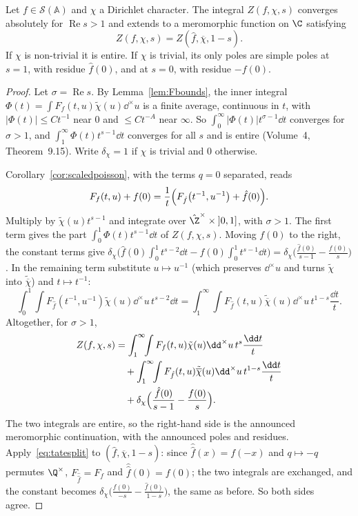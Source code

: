 \begin{theorem}\label{thm:tate}
Let $f\in\mathcal S(\mathbb{A})$ and $\chi$ a Dirichlet character. The integral $Z(f,\chi,s)$ converges absolutely for $\operatorname{Re}s>1$ and extends
to a meromorphic function on $\C$ satisfying
\[
Z(f,\chi,s)=Z(\hat f,\overline\chi,1-s).
\]
If $\chi$ is non-trivial it is entire. If $\chi$ is trivial, its only poles are simple poles at $s=1$, with residue $\hat f(0)$, and at
$s=0$, with residue $-f(0)$.
\end{theorem}
\begin{proof}
Let $\sigma=\operatorname{Re}s$. By Lemma~\ref{lem:Fbounds}, the inner integral $\Phi(t)=\int F_f(t,u)\tilde\chi(u)\dd^\times u$ is a finite average,
continuous in $t$, with $|\Phi(t)|\le Ct^{-1}$ near $0$ and $\le Ct^{-A}$ near $\infty$. So $\int_0^\infty|\Phi(t)|t^{\sigma-1}\dd t$ converges for
$\sigma>1$, and $\int_1^\infty\Phi(t)t^{s-1}\dd t$ converges for all $s$ and is entire (Volume~4, Theorem~9.15). Write $\delta_\chi=1$ if $\chi$ is
trivial and $0$ otherwise.

Corollary~\ref{cor:scaledpoisson}, with the terms $q=0$ separated, reads
\[
F_f(t,u)+f(0)=\frac1t\Bigl(F_{\hat f}\bigl(t^{-1},u^{-1}\bigr)+\hat f(0)\Bigr).
\]
Multiply by $\tilde\chi(u)t^{s-1}$ and integrate over $\hat{\Z}^\times\times\left]0,1\right]$, with $\sigma>1$. The first term gives the part
$\int_0^1\Phi(t)t^{s-1}\dd t$ of $Z(f,\chi,s)$. Moving $f(0)$ to the right, the constant terms give
$\delta_\chi\bigl(\hat f(0)\int_0^1t^{s-2}\dd t-f(0)\int_0^1t^{s-1}\dd t\bigr)=\delta_\chi\bigl(\frac{\hat f(0)}{s-1}-\frac{f(0)}s\bigr)$. In the remaining
term substitute $u\mapsto u^{-1}$ (which preserves $\dd^\times u$ and turns $\tilde\chi$ into $\tilde{\overline\chi}$) and $t\mapsto t^{-1}$:
\[
\int_0^1\!\!\int F_{\hat f}(t^{-1},u^{-1})\tilde\chi(u)\dd^\times u\,t^{s-2}\dd t=\int_1^\infty\!\!\int F_{\hat f}(t,u)\tilde{\overline\chi}(u)\dd^\times u\,t^{1-s}\frac{\dd t}t.
\]
Altogether, for $\sigma>1$,
\begin{equation}\label{eq:tatesplit}
\begin{aligned}
Z(f,\chi,s)&=\int_1^\infty\!\!\int F_f(t,u)\tilde\chi(u)\dd^\times u\,t^s\frac{\dd t}t\\
&\quad+\int_1^\infty\!\!\int F_{\hat f}(t,u)\tilde{\overline\chi}(u)\dd^\times u\,t^{1-s}\frac{\dd t}t\\
&\quad+\delta_\chi\Bigl(\frac{\hat f(0)}{s-1}-\frac{f(0)}s\Bigr).
\end{aligned}
\end{equation}
The two integrals are entire, so the right-hand side is the announced meromorphic continuation, with the announced poles and residues.
Apply~\eqref{eq:tatesplit} to $(\hat f,\overline\chi,1-s)$: since $\hat{\hat f}(x)=f(-x)$ and $q\mapsto-q$ permutes $\Q^\times$, $F_{\hat{\hat f}}=F_f$ and
$\hat{\hat f}(0)=f(0)$; the two integrals are exchanged, and the constant becomes $\delta_\chi\bigl(\frac{f(0)}{-s}-\frac{\hat f(0)}{1-s}\bigr)$, the same as
before. So both sides agree.
\end{proof}

